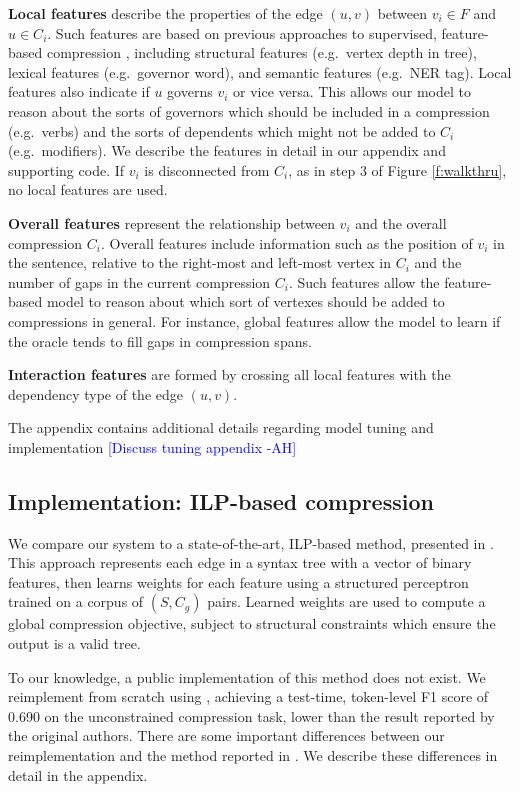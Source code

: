 \documentclass[11pt,a4paper]{article}
\newcommand{\ahcomment}[1]{\textcolor{blue}{[#1 -AH]}}
\begin{document}
\textbf{Local features} describe the properties of the edge $(u,v)$ between $v_i \in F$ and $u \in C_i$. Such features are based on previous approaches to supervised, feature-based compression \cite{filippova2013overcoming,almeida2013fast,Filippova2015FastKS}, including structural features (e.g.~vertex depth in tree), lexical features (e.g.~governor word), and semantic features (e.g.~NER tag). Local features also indicate if $u$ governs $v_i$ or vice versa. This allows our model to reason about the sorts of governors which should be included in a compression (e.g.~verbs) and the sorts of dependents which might not be added to $C_i$ (e.g.~modifiers). We describe the features in detail in our appendix and supporting code. If $v_i$ is disconnected from $C_i$, as in step 3 of Figure \ref{f:walkthru}, no local features are used.

\textbf{Overall features} represent the relationship between $v_i$ and the overall compression $C_i$. Overall features include information such as the position of $v_i$ in the sentence, relative to the right-most and left-most vertex in $C_i$ and the number of gaps in the current compression $C_i$. Such  features allow the feature-based model to reason about which sort of vertexes should be added to compressions in general. For instance, global features allow the model to learn if the oracle tends to fill gaps in compression spans.

\textbf{Interaction features} are formed by crossing all local features with the dependency type of the edge $(u,v)$.

The appendix contains additional details regarding model tuning and implementation \ahcomment{Discuss tuning appendix}

\subsection{Implementation: ILP-based compression}\label{s:ilp}

We compare our system to a state-of-the-art, ILP-based method, presented in \citet{filippova2013overcoming}. This approach represents each edge in a syntax tree with a vector of binary features, then learns weights for each feature using a structured perceptron trained on a corpus of $(S,C_g)$ pairs. Learned weights are used to compute a global compression objective, subject to structural constraints which ensure the output is a valid tree.

To our knowledge, a public implementation of this method does not exist. We reimplement from scratch using \citet{gurobi}, achieving a test-time, token-level F1 score of  0.690 on the unconstrained compression task, lower than the result reported by the original authors. There are some important differences between our reimplementation and the method reported in \citet{filippova2013overcoming}. We describe these differences in detail in the appendix.
\end{document}
